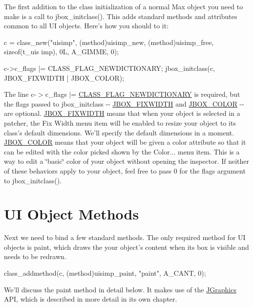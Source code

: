 The first addition to the class initialization of a normal Max object you need to make is a call to jbox\_\-initclass(). This adds standard methods and attributes common to all UI objects. Here's how you should to it:


\begin{DoxyCode}
    c = class_new("uisimp", (method)uisimp_new, (method)uisimp_free, sizeof(t_uis
      imp), 0L, A_GIMME, 0);

    c->c_flags |= CLASS_FLAG_NEWDICTIONARY;
    jbox_initclass(c, JBOX_FIXWIDTH | JBOX_COLOR);
\end{DoxyCode}


The line c-\/$>$c\_\-flags $|$= \hyperlink{group__class_gga124a08e1744d9e999211abaa9df9f556aab2bebd8a64110247fa11db1c13ca5eb}{CLASS\_\-FLAG\_\-NEWDICTIONARY} is required, but the flags passed to jbox\_\-initclass -\/-\/ \hyperlink{group__jbox_gafb46881fa4dbaf5073e1ee6929d7fa9d}{JBOX\_\-FIXWIDTH} and \hyperlink{group__jbox_ga14cb28210886cfe0df0c34f71338faf8}{JBOX\_\-COLOR} -\/-\/ are optional. \hyperlink{group__jbox_gafb46881fa4dbaf5073e1ee6929d7fa9d}{JBOX\_\-FIXWIDTH} means that when your object is selected in a patcher, the Fix Width menu item will be enabled to resize your object to its class's default dimensions. We'll specify the default dimensions in a moment. \hyperlink{group__jbox_ga14cb28210886cfe0df0c34f71338faf8}{JBOX\_\-COLOR} means that your object will be given a color attribute so that it can be edited with the color picked shown by the Color... menu item. This is a way to edit a \char`\"{}basic\char`\"{} color of your object without opening the inspector. If neither of these behaviors apply to your object, feel free to pass 0 for the flags argument to jbox\_\-initclass().\hypertarget{chapter_ui_anatomy_chapter_ui_anatomy_methods}{}\section{UI Object Methods}\label{chapter_ui_anatomy_chapter_ui_anatomy_methods}
Next we need to bind a few standard methods. The only required method for UI objects is paint, which draws the your object's content when its box is visible and needs to be redrawn.


\begin{DoxyCode}
    class_addmethod(c, (method)uisimp_paint,        "paint",    A_CANT, 0);
\end{DoxyCode}


We'll discuss the paint method in detail below. It makes use of the \hyperlink{group__jgraphics}{JGraphics} API, which is described in more detail in its own chapter.

